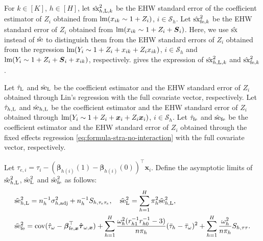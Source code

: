 \documentclass[12pt]{article}
\newcommand{\se}{\textnormal{se}}
\newcommand{\Lin}{\textnormal{L}}
\newcommand{\cov}{\operatorname{cov}}
\newcommand{\adj}{\textnormal{adj}}
\newcommand{\ms}{\mathcal{S}}
\newcommand{\fe}{\textnormal{fe}}
\newcommand{\lm}{\textnormal{lm}}
\newcommand{\bs}{\boldsymbol}
\newcommand{\sx}{\textnormal{sx}}
\begin{document}
For $k\in [K]$, $h\in [H]$, let $\hat{\sx}^2_{h,\Lin,k}$ be the EHW standard error of the coefficient estimator of $Z_i$ obtained from $\lm(x_{ik}\sim 1+Z_i)$, $i\in \ms_h$. Let $\hat{\sx}^2_{\fe ,k}$ be the EHW standard error of $Z_i$ obtained from $\lm(x_{ik}\sim 1+Z_i+\bs{S}_i)$. Here, we use $\hat{\sx}$ instead of $\hat{\se}$ to distinguish them from the EHW standard errors of $Z_i$ obtained from the regression $\lm(Y_i \sim 1+Z_i + x_{ik} + Z_i x_{ik})$, $i\in \ms_h$ and $\lm(Y_i \sim 1+Z_i+\bs{S}_i + x_{ik})$, respectively.  gives the expression of $\hat{\sx}^2_{h,\Lin,k}$ and $\hat{\sx}^2_{\fe ,k}$.
 
 Let $\hat{\tau}_{\Lin}$ and $\hat{\se}_{\Lin}$ be the coefficient estimator and the EHW standard error of $Z_i$  obtained through Lin's regression with the full covariate vector, respectively. Let $\hat{\tau}_{h,\Lin}$ and $\hat{\se}_{h,\Lin}$ be the coefficient estimator and the EHW standard error of $Z_i$ obtained through $\lm(Y_i \sim 1 + Z_i + \bs{x}_i + Z_i\bs{x}_i)$, $i\in \ms_h$. Let $\hat{\tau}_{\fe }$ and $\hat{\se}_{\fe }$ be the coefficient estimator and the EHW standard error of $Z_i$  obtained through the fixed effects regression \eqref{eq:formula-stra-no-interaction} with the full covariate vector, respectively.

 Let $\tau_{e,i} = \tau_i - (\bs{\beta}_{h(i)}(1) -\bs{\beta}_{h(i)}(0))^\top \bs{x}_i$. Define the asymptotic limits of $\hat{\se}^2_{h,\Lin}$, $\hat{\se}^2_{\Lin}$ and $\hat{\se}^2_{\fe}$ as follows:
\begin{align*}
    & \tilde{\se}^2_{h,\Lin} = n_h^{-1}\sigma_{h, \adj}^2 + n_h^{-1}S_{h,\tau_e \tau_e},\quad \tilde{\se}^2_{\Lin} = \sum_{h=1}^H \pi_h^2 \tilde{\se}^2_{h,\Lin},\\
    &      \tilde{\se}^2_{\fe } = \cov(\hat{\tau}_{\omega} - \bs{\beta}^\top_{\fe, \bs{x}}\hat{\bs{\tau}}_{\omega,\bs{x}}) + \sum_{h=1}^H \frac{\omega_h^2(r_{h1}^{-1}r_{h0}^{-1}-3)}{n\pi_h}(\bar{\tau}_h-\bar{\tau}_{\omega})^2 + \sum_{h=1}^H \frac{\omega_h^2}{n\pi_h}S_{h,\tau\tau}.
\end{align*} 
\end{document}
